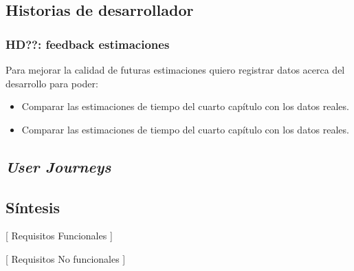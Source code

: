 \subsection{Historias de desarrollador}

\subsubsection{HD??: feedback estimaciones}
Para mejorar la calidad de futuras estimaciones quiero registrar datos acerca del desarrollo
para poder:

\begin{itemize}
   \item Comparar las estimaciones de tiempo del cuarto capítulo con los datos reales.
   \item Comparar las estimaciones de tiempo del cuarto capítulo con los datos reales.
\end{itemize}

\subsection{\textit{User Journeys}}

\subsection{Síntesis}

[ Requisitos Funcionales ]

[ Requisitos No funcionales ]
